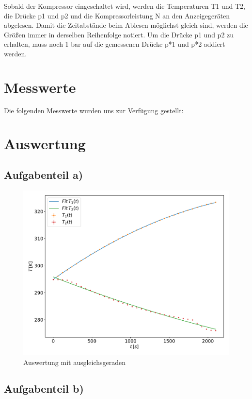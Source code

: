     Sobald der Kompressor eingeschaltet wird, werden die Temperaturen T1 und T2, die Drücke p1 und p2 und die Kompressorleistung N an den Anzeigegeräten abgelesen. Damit die Zeitabstände
    beim Ablesen möglichst gleich sind, werden die Größen immer in derselben Reihenfolge notiert. Um die Drücke p1 und p2 zu erhalten, muss noch 1 bar auf die gemessenen Drücke p*1 und p*2 addiert werden.

    \newpage
    \section{Messwerte}
    Die folgenden Messwerte wurden uns zur Verfügung gestellt:
    

    \newpage
    \section{Auswertung}
        \subsection{Aufgabenteil a)}
        \begin{figure}
               \centering
               \includegraphics[width=\textwidth]{grafic.pdf}
               \caption{Auswertung mit ausgleichsgeraden}
               \label{fig:grafic}
        \end{figure}


            

        \subsection{Aufgabenteil b)}


